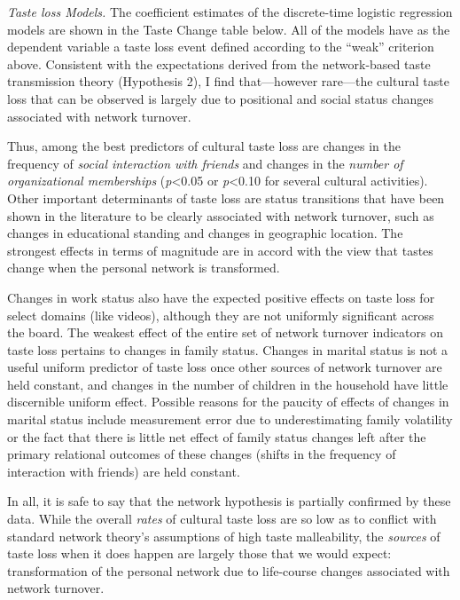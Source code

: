 \documentclass[
]{article}
\begin{document}
\emph{Taste loss Models.} The coefficient estimates of the discrete-time logistic regression models are shown in the Taste Change table below. All of the models have as the dependent variable a taste loss event defined according to the ``weak'' criterion above. Consistent with the expectations derived from the network-based taste transmission theory (Hypothesis 2), I find that---however rare---the cultural taste loss that can be observed is largely due to positional and social status changes associated with network turnover. 

Thus, among the best predictors of cultural taste loss are changes in the frequency of \emph{social interaction with friends} and changes in the \emph{number of organizational memberships} (\emph{p}\textless0.05 or \emph{p}\textless0.10 for several cultural activities). Other important determinants of taste loss are status transitions that have been shown in the literature to be clearly associated with network turnover, such as changes in educational standing and changes in geographic location. The strongest effects in terms of magnitude are in accord with the view that tastes change when the personal network is transformed.

Changes in work status also have the expected positive effects on taste loss for select domains (like videos), although they are not uniformly significant across the board. The weakest effect of the entire set of network turnover indicators on taste loss pertains to changes in family status. Changes in marital status is not a useful uniform predictor of taste loss once other sources of network turnover are held constant, and changes in the number of children in the household have little discernible uniform effect. Possible reasons for the paucity of effects of changes in marital status include measurement error due to underestimating family volatility or the fact that there is little net effect of family status changes left after the primary relational outcomes of these changes (shifts in the frequency of interaction with friends) are held constant.

In all, it is safe to say that the network hypothesis is partially confirmed by these data. While the overall \emph{rates} of cultural taste loss are so low as to conflict with standard network theory's assumptions of high taste malleability, the \emph{sources} of taste loss when it does happen are largely those that we would expect: transformation of the personal network due to life-course changes associated with network turnover.
\end{document}

